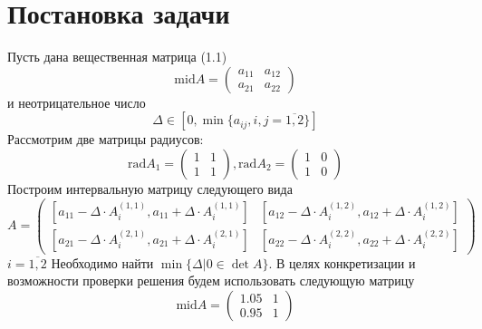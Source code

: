 \documentclass[a4paper,14pt]{article}
\begin{document}
	\section{Постановка задачи}
	Пусть дана вещественная матрица (1.1)
	\begin{equation}\text{mid} A = 
		\begin{pmatrix}
			a_{11} & a_{12}\\ 
			a_{21} & a_{22}
		\end{pmatrix}
	\end{equation}
	и неотрицательное число
	\begin{equation}
		\Delta \in [ 0, \min\{a_{ij}, i,j = \overline{1,2}\}]
	\end{equation}
	Рассмотрим две матрицы радиусов:
	\begin{equation}
		\text{rad}A_1 = \begin{pmatrix}
			1 & 1\\ 
			1 & 1
		\end{pmatrix}, \text{rad}A_2 = \begin{pmatrix}
		1 & 0\\ 
		1 & 0
	\end{pmatrix}
	\end{equation}
	Построим интервальную матрицу следующего вида
	\begin{equation}
		A = 
		\begin{pmatrix}
			[a_{11} - \Delta \cdot A^{(1,1)}_i, a_{11} + \Delta \cdot A^{(1,1)}_i ]  & [a_{12} - \Delta \cdot A^{(1,2)}_i, a_{12} + \Delta \cdot A^{(1,2)}_i ]\\ 
			[a_{21} - \Delta \cdot A^{(2,1)}_i, a_{21} + \Delta \cdot A^{(2,1)}_i ] & [a_{22} - \Delta \cdot A^{(2,2)}_i, a_{22} + \Delta \cdot A^{(2,2)}_i ]
		\end{pmatrix}
	\end{equation}
	$i=\overline{1,2}$
	Необходимо найти $\min\{\Delta|0 \in \det A\}$.
	В целях конкретизации и возможности проверки решения будем использовать следующую матрицу
	\begin{equation}
		\text{mid} A = \begin{pmatrix}
			1.05 & 1\\ 
			0.95 & 1
		\end{pmatrix}
	\end{equation}
\end{document}
